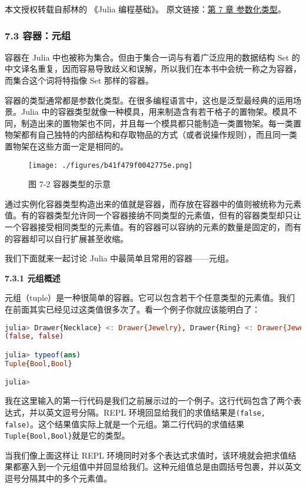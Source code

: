 
本文授权转载自郝林的 《Julia 编程基础》。 原文链接：\href{https://github.com/hyper0x/JuliaBasics/blob/master/book/ch07.md}{第 7 章 参数化类型}。


\subsubsection{7.3 容器：元组}

容器在 Julia 中也被称为集合。但由于集合一词与有着广泛应用的数据结构 Set 的中文译名重复，因而容易导致歧义和误解，所以我们在本书中会统一称之为容器，而集合这个词将特指像 Set 那样的容器。

容器的类型通常都是参数化类型。在很多编程语言中，这也是泛型最经典的运用场景。Julia 中的容器类型就像一种模具，用来制造含有若干格子的置物架。模具不同，制造出来的置物架也不同，并且每一个模具都只能制造一类置物架。每一类置物架都有自己独特的内部结构和存取物品的方式（或者说操作规则），而且同一类置物架在这些方面一定是相同的。
\begin{figure}[ht]
\centering
\texttt{[image: ./figures/b41f479f0042775e.png]}
\caption{图 7-2 容器类型的示意} \label{fig_JuC7S3_1}
\end{figure}

通过实例化容器类型构造出来的值就是容器，而存放在容器中的值则被统称为元素值。有的容器类型允许同一个容器接纳不同类型的元素值，但有的容器类型却只让一个容器接受相同类型的元素值。有的容器可以容纳的元素的数量是固定的，而有的容器却可以自行扩展甚至收缩。

我们下面就来一起讨论 Julia 中最简单且常用的容器——元组。

\textbf{7.3.1 元组概述 }

元组（tuple）是一种很简单的容器。它可以包含若干个任意类型的元素值。我们在前面其实已经见过这类值很多次了。看一个例子你就应该能明白了：
\begin{lstlisting}[language=julia]
julia> Drawer{Necklace} <: Drawer{Jewelry}, Drawer{Ring} <: Drawer{Jewelry}
(false, false)

julia> typeof(ans)
Tuple{Bool,Bool}

julia> 
\end{lstlisting}

我在这里输入的第一行代码是我们之前展示过的一个例子。这行代码包含了两个表达式，并以英文逗号分隔。REPL 环境回显给我们的求值结果是\verb|(false, false)|。这个结果值实际上就是一个元组。第二行代码的求值结果\verb|Tuple{Bool,Bool}|就是它的类型。

当我们像上面这样让 REPL 环境同时对多个表达式求值时，该环境就会把求值结果都塞入到一个元组值中并回显给我们。这种元组值总是由圆括号包裹，并以英文逗号分隔其中的多个元素值。

